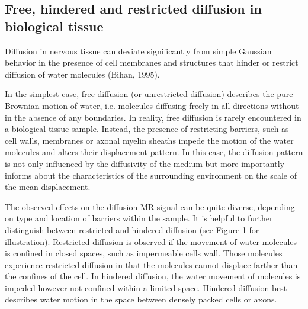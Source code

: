 \subsection[Types of diffusion]{Free, hindered and restricted diffusion in biological tissue}
Diffusion in nervous tissue can deviate significantly from simple Gaussian behavior in the presence of cell membranes and structures that hinder or restrict diffusion of water molecules (Bihan, 1995). 

In the simplest case, free diffusion (or unrestricted diffusion) describes the pure Brownian motion of water, i.e. molecules diffusing freely in all directions without in the absence of any boundaries. In reality, free diffusion is rarely encountered in a biological tissue sample. Instead, the presence of restricting barriers, such as cell walls, membranes or axonal myelin sheaths impede the motion of the water molecules and alters their displacement pattern. In this case, the diffusion pattern is not only influenced by the diffusivity of the medium but more importantly informs about the characteristics of the surrounding environment on the scale of the mean displacement. 

The observed effects on the diffusion MR signal can be quite diverse, depending on type and location of barriers within the sample. It is helpful to further distinguish between restricted and hindered diffusion (see Figure 1 for illustration). Restricted diffusion is observed if the movement of water molecules is confined in closed spaces, such as impermeable cells wall. Those molecules experience restricted diffusion in that the molecules cannot displace farther than the confines of the cell. In hindered diffusion, the water movement of molecules is impeded however not confined within a limited space. Hindered diffusion best describes water motion in the space between densely packed cells or axons. 

